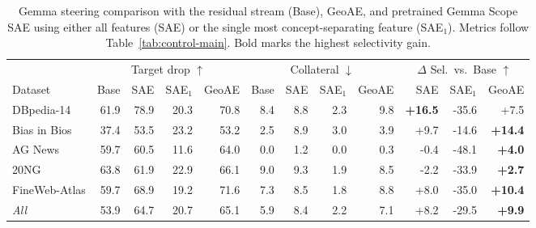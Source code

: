 \documentclass[11pt]{article}
\begin{document}
\begin{table}[t]
\centering
\small
\setlength{\tabcolsep}{4pt}
\begin{tabular}{@{}l rrrr rrrr rrr@{}}
\toprule
& \multicolumn{4}{c}{Target drop $\uparrow$}
& \multicolumn{4}{c}{Collateral $\downarrow$}
& \multicolumn{3}{c}{$\Delta$ Sel.\ vs.\ Base $\uparrow$} \\
\cmidrule(lr){2-5}
\cmidrule(lr){6-9}
\cmidrule(l){10-12}
Dataset
& Base & SAE & SAE$_1$ & GeoAE
& Base & SAE & SAE$_1$ & GeoAE
& SAE & SAE$_1$ & GeoAE \\
\midrule

DBpedia-14
& 61.9 & 78.9 & 20.3 & 70.8
& 8.4 & 8.8 & 2.3 & 9.8
& \textbf{+16.5} & -35.6 & +7.5 \\

Bias in Bios
& 37.4 & 53.5 & 23.2 & 53.2
& 2.5 & 8.9 & 3.0 & 3.9
& +9.7 & -14.6 & \textbf{+14.4} \\

AG News
& 59.7 & 60.5 & 11.6 & 64.0
& 0.0 & 1.2 & 0.0 & 0.3
& -0.4 & -48.1 & \textbf{+4.0} \\

20NG
& 63.8 & 61.9 & 22.9 & 66.1
& 9.0 & 9.3 & 1.9 & 8.5
& -2.2 & -33.9 & \textbf{+2.7} \\

FineWeb-Atlas
& 59.7 & 68.9 & 19.2 & 71.6
& 7.3 & 8.5 & 1.8 & 8.8
& +8.0 & -35.0 & \textbf{+10.4} \\

\emph{All}
& 53.9 & 64.7 & 20.7 & 65.1
& 5.9 & 8.4 & 2.2 & 7.1
& +8.2 & -29.5 & \textbf{+9.9} \\

\bottomrule
\end{tabular}
\caption{
Gemma steering comparison with the residual stream (Base), GeoAE,
and pretrained Gemma Scope SAE using either all features (SAE) or the
single most concept-separating feature (SAE$_1$). Metrics follow
Table~\ref{tab:control-main}. Bold marks the highest selectivity gain.
}
\label{tab:control-gemma}
\end{table}
\end{document}
